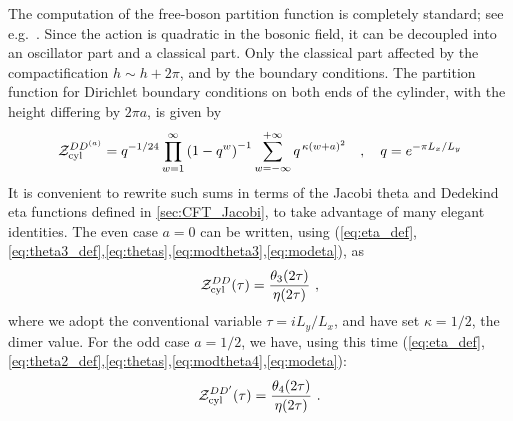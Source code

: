 \documentclass[11pt]{iopart}
\begin{document}
The computation of the free-boson partition function is completely standard; see e.g.\ \cite{EggertAffleck,FSW,BigYellowBook}. Since the action is quadratic in the bosonic field, it can be decoupled into an oscillator part and a classical part. Only the classical part affected by the compactification $h\sim h+2\pi$, and by the boundary conditions. The partition function for Dirichlet boundary conditions on both ends of the cylinder, with the height differing by $2\pi a$, is given by
\begin{equation}
 \mathcal{Z}_{\rm cyl}^{DD^{(a)}}=q^{-1/24}\prod_{w=1}^{\infty}\left(1-q^w\right)^{-1}\sum_{w=-\infty}^{+\infty}q^{\,\kappa (w+a)^2}\quad,\quad q=e^{-\pi L_x/L_y}
\end{equation}
It is convenient to rewrite such sums in terms of the Jacobi theta and Dedekind eta functions defined in \ref{sec:CFT_Jacobi}, to take advantage of many elegant identities. 
The even case $a=0$ can be written, using (\ref{eq:eta_def},\ref{eq:theta3_def},\ref{eq:thetas},\ref{eq:modtheta3},\ref{eq:modeta}), as
\begin{equation}\label{eq:cylinder_dd}
 \mathcal{Z}_{\rm cyl}^{DD}(\tau)=\frac{\theta_3(2\tau)}{\eta(2\tau)}\ ,
\end{equation}
where we adopt the conventional variable  $\tau=i L_y/L_x$, and have set $\kappa=1/2$, the dimer value.
For the odd case $a=1/2$, we have, using this time (\ref{eq:eta_def},\ref{eq:theta2_def},\ref{eq:thetas},\ref{eq:modtheta4},\ref{eq:modeta}):
\begin{equation}
\label{eq:cylinder_ddprime}
 \mathcal{Z}_{\rm cyl}^{DD^\prime}(\tau)=\frac{\theta_4(2\tau)}{\eta(2\tau)}\ .
\end{equation}
\end{document}
